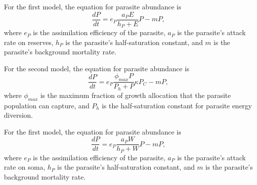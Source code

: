 \documentclass[12pt,reqno,final,pdftex]{amsart}\usepackage[]{graphicx}\usepackage[]{color}
\theoremstyle{plain}
\numberwithin{equation}{part}
\begin{document}
For the first model, the equation for parasite abundance is
\begin{equation}
\frac{dP}{dt} = e_P \frac{a_P E}{h_P + E} P - m P,
\end{equation}
where $e_P$ is the assimilation efficiency of the parasite, $a_P$ is the parasite's attack rate on reserves, $h_P$ is the parasite's half-saturation constant, and $m$ is the parasite's background mortality rate.

For the second model, the equation for parasite abundance is
\begin{equation}
\frac{dP}{dt} = e_P \frac{\phi_{max} P}{P_h + P} \kappa P_C - m P,
\end{equation}
where $\phi_{max}$ is the maximum fraction of growth allocation that the parasite population can capture, and $P_h$ is the half-saturation constant for parasite energy diversion.

For the first model, the equation for parasite abundance is
\begin{equation}
\frac{dP}{dt} = e_P \frac{a_P W}{h_P + W} P - m P,
\end{equation}
where $e_P$ is the assimilation efficiency of the parasite, $a_P$ is the parasite's attack rate on soma, $h_P$ is the parasite's half-saturation constant, and $m$ is the parasite's background mortality rate.
\end{document}
